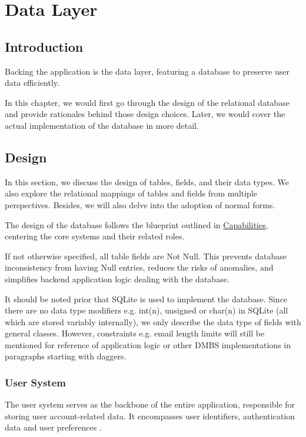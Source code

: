 \chapter{Data Layer}
\label{data-layer}

\section{Introduction}
\label{data-layer.intro}

Backing the application is the data layer, featuring a database to preserve user
data efficiently.

In this chapter, we would first go through the design of the relational database
and provide rationales behind those design choices. Later, we would cover the actual
implementation of the database in more detail.

\section{Design}
\label{data-layer.design}

In this section, we discuss the design of tables, fields, and their data types.
We also explore the relational mappings of tables and fields from multiple
perspectives. Besides, we will also delve into the adoption of normal forms.

The design of the database follows the blueprint outlined in
\hyperref[overview.capab]{Capabilities}, centering the core systems and their related
roles.

If not otherwise specified, all table fields are Not Null. This prevents database
inconsistency from having Null entries, reduces the risks of anomalies, and simplifies
backend application logic dealing with the database.

It should be noted prior that SQLite is used to implement the database. Since
there are no data type modifiers e.g. int(n), unsigned or char(n) in SQLite (all
which are stored variably internally), we only describe the data type of fields with
general classes. However, constraints e.g. email length limits will still be
mentioned for reference of application logic or other DMBS implementations in
paragraphs starting with daggers.

\subsection{User System}
\label{data-layer.design.user}

The user system serves as the backbone of the entire application, responsible
for storing user account-related data. It encompasses user identifiers,
authentication data and user preferences \textdagger{}.

